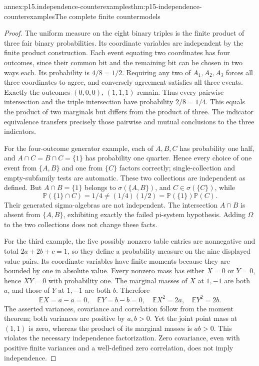 \begin{annexitem}{annex:p15.independence-counterexamples}{thm:p15-independence-counterexamples}{The complete finite countermodels}
\begin{proof}
The uniform measure on the eight binary triples is the finite
product of three fair binary probabilities. Its coordinate variables
are independent by the finite product construction. Each event
equating two coordinates has four outcomes, since their common bit
and the remaining bit can be chosen in two ways each. Its probability
is \(4/8=1/2\). Requiring any two of \(A_1,A_2,A_3\) forces
all three coordinates to agree, and conversely agreement satisfies
all three events. Exactly the outcomes \((0,0,0)\), \((1,1,1)\)
remain. Thus every pairwise intersection and the triple intersection
have probability \(2/8=1/4\). This equals the product of two
marginals but differs from the product of three. The indicator
equivalence transfers precisely those pairwise and mutual conclusions
to the three indicators.

For the four-outcome generator example, each of \(A,B,C\) has
probability one half, and \(A\cap C=B\cap C=\{1\}\) has
probability one quarter. Hence every choice of one event from
\(\{A,B\}\) and one from \(\{C\}\) factors correctly;
single-collection and empty-subfamily tests are automatic. These
two collections are independent as defined. But
\(A\cap B=\{1\}\) belongs to \(\sigma(\{A,B\})\), and
\(C\in\sigma(\{C\})\), while
\[
 \mathbb P(\{1\}\cap C)=1/4
       \ne(1/4)(1/2)=\mathbb P(\{1\})\mathbb P(C).
\]
Their generated sigma-algebras are not independent. The intersection
\(A\cap B\) is absent from \(\{A,B\}\), exhibiting exactly
the failed pi-system hypothesis. Adding \(\Omega\) to the two
collections does not change these facts.

For the third example, the five possibly nonzero table entries are
nonnegative and total \(2a+2b+c=1\), so they define a probability
measure on the nine displayed value pairs. Its coordinate variables
have finite moments because they are bounded by one in absolute value.
Every nonzero mass has either \(X=0\) or \(Y=0\), hence
\(XY=0\) with probability one. The marginal masses of \(X\)
at \(1,-1\) are both \(a\), and those of \(Y\) at
\(1,-1\) are both \(b\). Therefore
\[
 \mathbb E X=a-a=0,\quad \mathbb E Y=b-b=0,\quad
 \mathbb E X^2=2a,\quad \mathbb E Y^2=2b.
\]
The asserted variances, covariance and correlation follow from the
moment theorem; both variances are positive by \(a,b>0\).
Yet the joint point mass at \((1,1)\) is zero, whereas the
product of its marginal masses is \(ab>0\). This violates the
necessary independence factorization. Zero covariance, even with
positive finite variances and a well-defined zero correlation, does
not imply independence.


\end{proof}
\end{annexitem}
